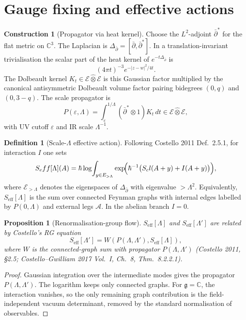 \documentclass[11pt]{amsart}
\providecommand{\C}{\mathbb{C}}
\providecommand{\dbar}{\bar{\partial}}
\providecommand{\g}{\mathfrak{g}}
\providecommand{\cE}{\mathcal{E}}
\providecommand{\cA}{\mathcal{A}}
\providecommand{\eff}{\mathrm{eff}}
\providecommand{\cl}{\mathrm{cl}}
\theoremstyle{plain}
\newtheorem{proposition}[theorem]{Proposition}
\theoremstyle{definition}
\newtheorem{definition}[theorem]{Definition}
\newtheorem{construction}[theorem]{Construction}
\theoremstyle{remark}
\begin{document}
\section{Gauge fixing and effective actions}

\begin{construction}[Propagator via heat kernel]\label{cons:propagator}
Choose the $L^2$-adjoint $\dbar^\ast$ for the flat metric on $\C^3$.
The Laplacian is $\Delta_{\dbar}=[\dbar,\dbar^\ast]$. In a
translation-invariant trivialisation the scalar part of the heat kernel
of $e^{-t\Delta_{\dbar}}$ is
\[
  (4\pi t)^{-3}e^{-|z-w|^2/4t}.
\]
The Dolbeault kernel $K_t\in\cE\widehat{\otimes}\cE$ is this Gaussian
factor multiplied by the canonical antisymmetric Dolbeault volume factor
pairing bidegrees $(0,q)$ and $(0,3-q)$. The scale propagator is
\[
  P(\varepsilon,\Lambda)
  =
  \int_\varepsilon^{1/\Lambda}(\dbar^\ast\otimes 1)K_t\,dt
  \in\cE\widehat{\otimes}\cE,
\]
with UV cutoff $\varepsilon$ and IR scale $\Lambda^{-1}$.
\end{construction}

\begin{definition}[Scale-$\Lambda$ effective action]\label{def:S-eff}
Following Costello 2011 Def.~2.5.1, for interaction $I$ one sets
\[
S_\eff[\Lambda](\cA)
=
\hbar\log\!\int_{y\in\cE_{>\Lambda}}
\exp\!\Bigl(\hbar^{-1}\bigl(S_\cl(\cA+y)+I(\cA+y)\bigr)\Bigr),
\]
where $\cE_{>\Lambda}$ denotes the eigenspaces of $\Delta_{\dbar}$ with
eigenvalue $>\Lambda^2$. Equivalently, $S_\eff[\Lambda]$ is the sum over
connected Feynman graphs with internal edges labelled by $P(0,\Lambda)$
and external legs $\cA$. In the abelian branch $I=0$.
\end{definition}

\begin{proposition}[Renormalisation-group flow]\label{prop:RG}
$S_\eff[\Lambda]$ and $S_\eff[\Lambda']$ are related by Costello's RG
equation
\[
  S_\eff[\Lambda']
  =
  W(P(\Lambda,\Lambda'),S_\eff[\Lambda]),
\]
where $W$ is the connected-graph sum with propagator
$P(\Lambda,\Lambda')$
(Costello 2011, \S2.5; Costello--Gwilliam 2017 Vol.~I,
Ch.~8, Thm.~8.2.2.1).
\end{proposition}

\begin{proof}
Gaussian integration over the intermediate modes gives the propagator
$P(\Lambda,\Lambda')$. The logarithm keeps only connected graphs. For
$\g=\C$, the interaction vanishes, so the only remaining graph
contribution is the field-independent vacuum determinant, removed by
the standard normalisation of observables.
\end{proof}
\end{document}
